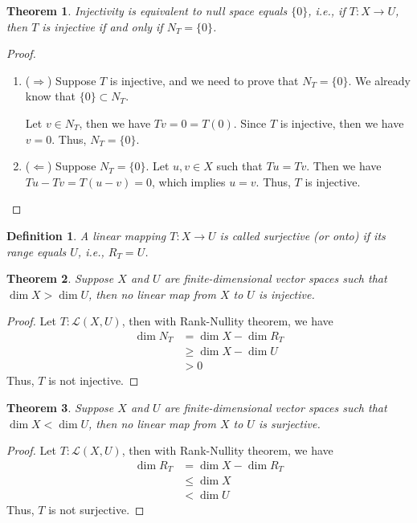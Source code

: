 \documentclass[11pt]{book}
\newtheorem{definition}{Definition}[section]
\newtheorem{theorem}{Theorem}[section]
\theoremstyle{definition}
\numberwithin{equation}{chapter}
\begin{document}
\medskip

\begin{theorem}
Injectivity is equivalent to null space equals $\{0\}$, i.e., if $T:X\to U$, then $T$ is injective if and only if $N_T = \{0\}$.
\end{theorem}
\begin{proof}
~\begin{enumerate}[label=(\arabic*)]
    \item ($\Rightarrow$) Suppose $T$ is injective, and we need to prove that $N_T = \{0\}$. We already know that $\{0\}\subset N_T$. 
    
    Let $v\in N_T$, then we have $Tv = 0 = T(0)$. Since $T$ is injective, then we have $v = 0$. Thus, $N_T = \{0\}$.
    \item ($\Leftarrow$) Suppose $N_T = \{0\}$. Let $u,v\in X$ such that $Tu = Tv$. Then we have $Tu - Tv = T(u - v) = 0$, which implies $u = v$. Thus, $T$ is injective.
\end{enumerate}
\end{proof}

\medskip

\begin{definition}
A linear mapping $T:X\to U$ is called surjective (or onto) if its range equals $U$, i.e., $R_T = U$.
\end{definition}

\medskip

\begin{theorem}
Suppose $X$ and $U$ are finite-dimensional vector spaces such that $\dim X > \dim U$, then no linear map from $X$ to $U$ is injective.
\end{theorem}
\begin{proof}
Let $T:\mathscr{L}(X,U)$, then with Rank-Nullity theorem, we have
\begin{align*}
    \dim N_T & = \dim X - \dim R_T \\
    & \geq \dim X - \dim U \\
    & > 0
\end{align*}
Thus, $T$ is not injective.
\end{proof}

\medskip

\begin{theorem}
Suppose $X$ and $U$ are finite-dimensional vector spaces such that $\dim X < \dim U$, then no linear map from $X$ to $U$ is surjective.
\end{theorem}
\begin{proof}
Let $T:\mathscr{L}(X,U)$, then with Rank-Nullity theorem, we have
\begin{align*}
    \dim R_T & = \dim X - \dim R_T \\
    & \leq \dim X \\
    & < \dim U
\end{align*}
Thus, $T$ is not surjective.
\end{proof}
\end{document}
